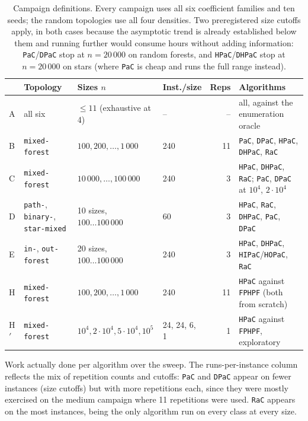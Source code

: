 \documentclass[11pt]{article}
\newcommand{\tab}[1]{}
\begin{document}
\begin{table}[htbp]
\centering
\caption{Campaign definitions. Every campaign uses all six coefficient
families and ten seeds; the random topologies use all four densities. Two
preregistered size cutoffs apply, in both cases because the asymptotic trend
is already established below them and running further would consume hours
without adding information: \texttt{PaC}/\texttt{DPaC} stop at $n=20\,000$ on
random forests, and \texttt{HPaC}/\texttt{DHPaC} stop at $n=20\,000$ on stars
(where \texttt{PaC} is cheap and runs the full range instead).}
\label{tab:campaigns}
\begin{adjustbox}{max width=\textwidth}
\small
\begin{tabular}{@{}llllrl@{}}
\toprule
& Topology & Sizes $n$ & Inst./size & Reps & Algorithms \\
\midrule
A & all six & $\le11$ (exhaustive at 4) & -- & -- &
all, against the enumeration oracle \\
B & \texttt{mixed-forest} & $100,200,\dots,1\,000$ & 240 & 11 &
\texttt{PaC}, \texttt{DPaC}, \texttt{HPaC}, \texttt{DHPaC}, \texttt{RaC} \\
C & \texttt{mixed-forest} & $10\,000,\dots,100\,000$ & 240 & 3 &
\texttt{HPaC}, \texttt{DHPaC}, \texttt{RaC}; \texttt{PaC}, \texttt{DPaC} at
$10^4$, $2\cdot10^4$ \\
D & \texttt{path-}, \texttt{binary-}, \texttt{star-mixed} & 10 sizes,
$100\dots100\,000$ & 60 & 3 &
\texttt{HPaC}, \texttt{RaC}, \texttt{DHPaC}, \texttt{PaC}, \texttt{DPaC} \\
E & \texttt{in-}, \texttt{out-forest} & 20 sizes,
$100\dots100\,000$ & 240 & 3 &
\texttt{HPaC}, \texttt{DHPaC}, \texttt{HIPaC}/\texttt{HOPaC}, \texttt{RaC} \\
H & \texttt{mixed-forest} & $100,200,\dots,1\,000$ & 240 & 11 &
\texttt{HPaC} against \texttt{FPHPF} (both from scratch) \\
H$'$ & \texttt{mixed-forest} & $10^4,2\cdot10^4,5\cdot10^4,10^5$ & 24, 24, 6, 1 & 1 &
\texttt{HPaC} against \texttt{FPHPF}, exploratory \\
\bottomrule
\end{tabular}
\end{adjustbox}
\end{table}

\begin{table}[htbp]
\centering
\caption{Work actually done per algorithm over the sweep. The
runs-per-instance column reflects the mix of repetition counts and cutoffs:
\texttt{PaC} and \texttt{DPaC} appear on fewer instances (size cutoffs) but
with more repetitions each, since they were mostly exercised on the medium
campaign where 11 repetitions were used. \texttt{RaC} appears on the most
instances, being the only algorithm run on every class at every size.}
\label{tab:runs}
\small
\tab{rep_runs_per_algorithm}
\end{table}
\end{document}
